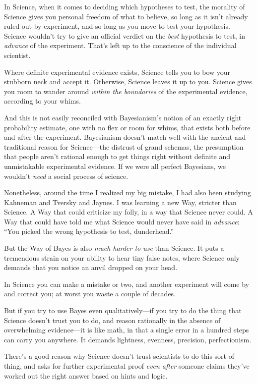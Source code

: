 {
 In Science, when it comes to deciding which hypotheses to test,
the morality of Science gives you personal freedom of what to believe,
so long as it isn't already ruled out by experiment,
and so long as you move to test your hypothesis. Science
wouldn't try to give an official verdict on the
\textit{best} hypothesis to test, in \textit{advance} of the
experiment. That's left up to the conscience of the
individual scientist.}

{
 Where definite experimental evidence exists, Science tells you to
bow your stubborn neck and accept it. Otherwise, Science leaves it up
to you. Science gives you room to wander around \textit{within the
boundaries} of the experimental evidence, according to your whims.}

{
 And this is not easily reconciled with
Bayesianism's notion of an exactly right probability
estimate, one with no flex or room for whims, that exists both before
and after the experiment. Bayesianism doesn't match
well with the ancient and traditional reason for Science---the distrust
of grand schemas, the presumption that people aren't
rational enough to get things right without definite and unmistakable
experimental evidence. If we were all perfect Bayesians, we
wouldn't \textit{need} a social process of science.}

{
 Nonetheless, around the time I realized my big mistake, I had also
been studying Kahneman and Tversky and Jaynes. I was learning a new
Way, stricter than Science. A Way that could criticize my folly, in a
way that Science never could. A Way that could have told me what
Science would never have said in \textit{advance}:
``You picked the wrong hypothesis to test,
dunderhead.''}

{
 But the Way of Bayes is also \textit{much harder to use} than
Science. It puts a tremendous strain on your ability to hear tiny false
notes, where Science only demands that you notice an anvil dropped on
your head.}

{
 In Science you can make a mistake or two, and another experiment
will come by and correct you; at worst you waste a couple of decades.}

{
 But if you try to use Bayes even qualitatively---if you try to do
the thing that Science doesn't trust you to do, and
reason rationally in the absence of overwhelming evidence---it is like
math, in that a single error in a hundred steps can carry you anywhere.
It demands lightness, evenness, precision, perfectionism.}

{
 There's a good reason why Science
doesn't trust scientists to do this sort of thing, and
asks for further experimental proof \textit{even after} someone claims
they've worked out the right answer based on hints and
logic.}

